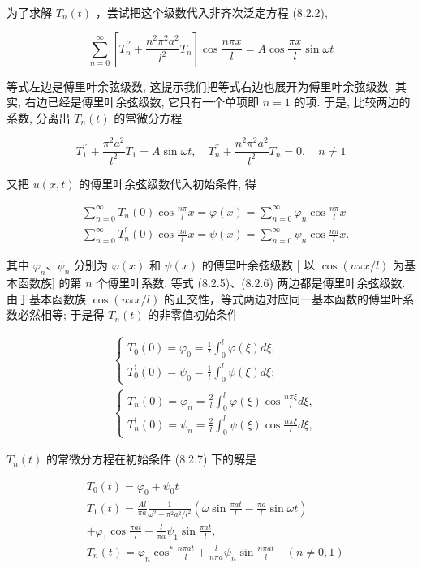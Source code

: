 为了求解 $T_{n}(t)$ ，尝试把这个级数代入非齐次泛定方程 (8.2.2),

$$
\sum_{n=0}^{\infty}\left[T_{n}^{\prime \prime}+\frac{n^{2} \pi^{2} a^{2}}{l^{2}} T_{n}\right] \cos \frac{n \pi x}{l}=A \cos \frac{\pi x}{l} \sin \omega t
$$

等式左边是傅里叶余弦级数, 这提示我们把等式右边也展开为傅里叶余弦级数. 其实, 右边已经是傅里叶余弦级数, 它只有一个单项即 $n=1$ 的项. 于是, 比较两边的系数, 分离出 $T_{n}(t)$ 的常微分方程

$$
T_{1}^{\prime \prime}+\frac{\pi^{2} a^{2}}{l^{2}} T_{1}=A \sin \omega t, \quad T_{n}^{\prime \prime}+\frac{n^{2} \pi^{2} a^{2}}{l^{2}} T_{n}=0, \quad n \neq 1
$$

又把 $u(x, t)$ 的傅里叶余弦级数代入初始条件, 得

$$
\begin{aligned}
& \sum_{n=0}^{\infty} T_{n}(0) \cos \frac{n \pi}{l} x=\varphi(x)=\sum_{n=0}^{\infty} \varphi_{n} \cos \frac{n \pi}{l} x \\
& \sum_{n=0}^{\infty} T_{n}^{\prime}(0) \cos \frac{n \pi}{l} x=\psi(x)=\sum_{n=0}^{\infty} \psi_{n} \cos \frac{n \pi}{l} x .
\end{aligned}
$$

其中 $\varphi_{n} 、 \psi_{n}$ 分别为 $\varphi(x)$ 和 $\psi(x)$ 的傅里叶余弦级数 [ 以 $\cos (n \pi x / l)$ 为基本函数族] 的第 $n$ 个傅里叶系数. 等式 (8.2.5)、(8.2.6) 两边都是傅里叶余弦级数. 由于基本函数族 $\cos (n \pi x / l)$ 的正交性，等式两边对应同一基本函数的傅里叶系数必然相等; 于是得 $T_{n}(t)$ 的非零值初始条件

$$
\begin{aligned}
& \left\{\begin{array}{l}
T_{0}(0)=\varphi_{0}=\frac{1}{l} \int_{0}^{l} \varphi(\xi) d \xi, \\
T_{0}^{\prime}(0)=\psi_{0}=\frac{1}{l} \int_{0}^{l} \psi(\xi) d \xi ;
\end{array}\right. \\
& \left\{\begin{array}{l}
T_{n}(0)=\varphi_{n}=\frac{2}{l} \int_{0}^{l} \varphi(\xi) \cos \frac{n \pi \xi}{l} d \xi, \\
T_{n}^{\prime}(0)=\psi_{n}=\frac{2}{l} \int_{0}^{l} \psi(\xi) \cos \frac{n \pi \xi}{l} d \xi,
\end{array}\right.
\end{aligned}
$$

$T_{n}(t)$ 的常微分方程在初始条件 (8.2.7) 下的解是

$$
\begin{aligned}
& T_{0}(t)=\varphi_{0}+\psi_{0} t \\
& T_{1}(t)=\frac{A l}{\pi a} \frac{1}{\omega^{2}-\pi^{2} a^{2} / l^{2}}\left(\omega \sin \frac{\pi a t}{l}-\frac{\pi a}{l} \sin \omega t\right) \\
&+\varphi_{1} \cos \frac{\pi a t}{l}+\frac{l}{\pi a} \psi_{1} \sin \frac{\pi a t}{l}, \\
& T_{n}(t)=\varphi_{n} \cos ^{*} \frac{n \pi a t}{l}+\frac{l}{n \pi a} \psi_{n} \sin \frac{n \pi a t}{l} \quad(n \neq 0,1)
\end{aligned}
$$

